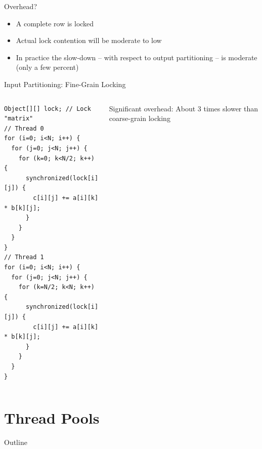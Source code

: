 \begin{frame}{Overhead?}
  \begin{itemize}
  \item A complete row is locked
  \item Actual lock contention will be moderate to low
  \item In practice the slow-down -- with respect to output
    partitioning -- is moderate (only a few percent)
  \end{itemize}
\end{frame}

\begin{frame}[fragile]{Input Partitioning: Fine-Grain Locking}
  \begin{columns}[c]
    \begin{column}{0.6\textwidth}
\begin{lstlisting}[basicstyle=\fontsize{8}{10}\selectfont\ttfamily]
Object[][] lock; // Lock "matrix"
// Thread 0
for (i=0; i<N; i++) {
  for (j=0; j<N; j++) {
    for (k=0; k<N/2; k++) {
      synchronized(lock[i][j]) {
        c[i][j] += a[i][k] * b[k][j];
      }
    }
  }
}
// Thread 1
for (i=0; i<N; i++) {
  for (j=0; j<N; j++) {
    for (k=N/2; k<N; k++) {
      synchronized(lock[i][j]) {
        c[i][j] += a[i][k] * b[k][j];
      }
    }
  }
}
\end{lstlisting}
    \end{column}
    \begin{column}{0.4\textwidth}
      \alert{Significant overhead:} About 3 times slower than
      coarse-grain locking
    \end{column}
  \end{columns}  
\end{frame}


\section{Thread Pools}

\begin{frame}{Outline}
  \tableofcontents[current]
\end{frame}

